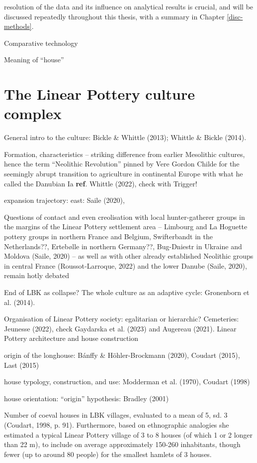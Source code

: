 \documentclass[
  12pt,
]{book}
\begin{document}
resolution of the data and its influence on analytical results is crucial, and will be discussed repeatedly throughout this thesis, with a summary in Chapter \ref{disc-methods}.

Comparative technology

Meaning of ``house''

\hypertarget{lbk}{%
\section{The Linear Pottery culture complex}\label{lbk}}

General intro to the culture: Bickle \& Whittle (2013); Whittle \& Bickle (2014).

Formation, characteristics -- striking difference from earlier Mesolithic cultures, hence the term ``Neolithic Revolution'' pinned by Vere Gordon Childe for the seemingly abrupt transition to agriculture in continental Europe with what he called the Danubian Ia \textbf{ref}. Whittle (2022), check with Trigger!

expansion trajectory: east: Saile (2020),

Questions of contact and even creolisation with local hunter-gatherer groups in the margins of the Linear Pottery settlement area -- Limbourg and La Hoguette pottery groups in northern France and Belgium, Swifterbandt in the Netherlands??, Ertebølle in northern Germany??, Bug-Dniestr in Ukraine and Moldova (Saile, 2020) -- as well as with other already established Neolithic groups in central France (Roussot‑Larroque, 2022) and the lower Danube (Saile, 2020), remain hotly debated

End of LBK as collapse? The whole culture as an adaptive cycle: Gronenborn et al. (2014).

Organisation of Linear Pottery society: egalitarian or hierarchic? Cemeteries: Jeunesse (2022), check Gaydarska et al. (2023) and Augereau (2021). Linear Pottery architecture and house construction

origin of the longhouse: Bánffy \& Höhler-Brockmann (2020), Coudart (2015), Last (2015)

house typology, construction, and use: Modderman et al. (1970), Coudart (1998)

house orientation: ``origin'' hypothesis: Bradley (2001)

Number of coeval houses in LBK villages, evaluated to a mean of 5, sd. 3 (Coudart, 1998, p. 91). Furthermore, based on ethnographic analogies she estimated a typical Linear Pottery village of 3 to 8 houses (of which 1 or 2 longer than 22 m), to include on average approximately 150-260 inhabitants, though fewer (up to around 80 people) for the smallest hamlets of 3 houses.
\end{document}
